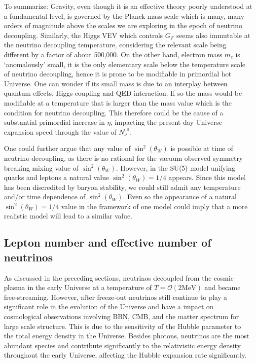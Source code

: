 To summarize: Gravity, even though it is an effective theory poorly understood at a fundamental level, is governed by the Planck mass scale which is many, many orders of magnitude above the scales we are exploring in the epoch of neutrino decoupling. Similarly, the Higgs VEV which controls $G_F$ seems also immutable at the neutrino decoupling temperature, considering the relevant scale being different by a factor of about 500,000. On the other hand, electron mass $m_e$ is `anomalously' small, it is the only elementary scale below the temperature scale of neutrino decoupling, hence it is prone to be modifiable in primordial hot Universe. One can wonder if its small mass is due to an interplay between quantum effects, Higgs coupling and QED interaction. If so the mass would be modifiable at a temperature that is larger than the mass value which is the condition for neutrino decoupling. This therefore could be the cause of a substantial primordial increase in $\eta$, impacting the present day Universe expansion speed through the value of $N_\nu^\mathrm{eff}$.
 
One could further argue that any value of $\sin^2(\theta_W)$ is possible at time of neutrino decoupling, as there is no rational for the vacuum observed symmetry breaking mixing value of $\sin^2(\theta_W)$. However, in the SU(5) model unifying quarks and leptons a natural value $\sin^2(\theta_W)=1/4$ appears. Since this model has been discredited by baryon stability, we could still admit any temperature and/or time dependence of $\sin^2(\theta_W)$. Even so the appearance of a natural $\sin^2(\theta_W)=1/4$ value in the framework of one model could imply that a more realistic model will lead to a similar value.

\subsection{Lepton number and effective number of neutrinos}\label{sec:NeffIntro}
As discussed in the preceding sections, neutrinos decoupled from the cosmic plasma in the early Universe at a temperature of $T=\mathcal{O}(2\mathrm{MeV})$ and became free-streaming. However, after freeze-out neutrinos still continue to play a significant role in the evolution of the Universe and have a impact on cosmological observations involving BBN, CMB, and the matter spectrum for large scale structure. This is due to the sensitivity of the Hubble parameter to the total energy density in the Universe. Besides photons, neutrinos are the most abundant species and contribute significantly to the relativistic energy density throughout the early Universe, affecting the Hubble expansion rate significantly. 

